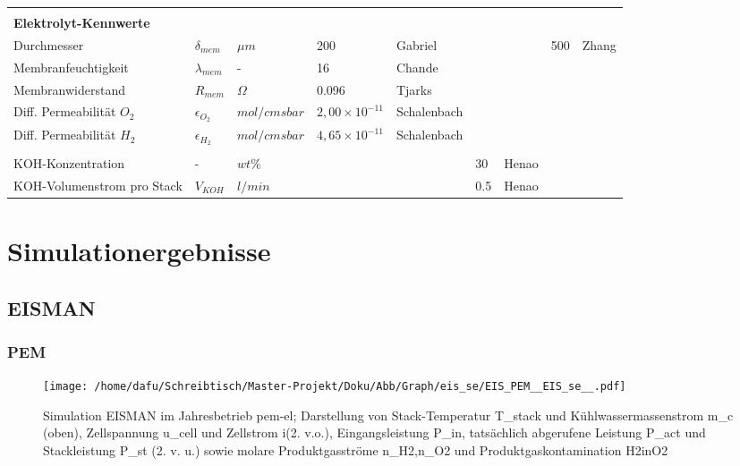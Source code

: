 \documentclass[onecolumn,10pt,titlepage]{article}
\begin{document}
\begin{table}[]
\begin{tabular*}{\textwidth}{lllllllll}
		&&&&&&&& \\
		\textbf{Elektrolyt-Kennwerte}&&&&&&&& \\
		Durchmesser								& $\delta_{mem}$		& $\mu{m}$			& 200		& Gabriel	&			&			& 500   & Zhang \\			
		Membranfeuchtigkeit						& $\lambda_{mem}$		& -					& 16  		& Chande	& 			& 			& 		& 		\\
		Membranwiderstand						& $R_{mem}$ 			& $\Omega$			& 0.096		& Tjarks	& 	 		& 			& 	 	& 		\\
		Diff. Permeabilität $O_{2}$				& $\epsilon_{O_{2}}$	& $mol/cmsbar$		& $2,00\times{10^{-11}}$	& Schalenbach			&			&						&	 \\
		Diff. Permeabilität $H_{2}$				& $\epsilon_{H_{2}}$	& $mol/cmsbar$		& $4,65\times{10^{-11}}$	& Schalenbach			&			&						&	 \\
		
		&&&&&&&& \\
		KOH-Konzentration 						& - 					& $wt\%$ 			&			&			& 30 		& Henao		&		& 		\\
		KOH-Volumenstrom pro Stack 				& $V_{KOH}$ 			& $l/min$ 			&			&			& 0.5 		& Henao		&		& 		\\
		
		
		
		
	\end{tabular*}
\end{table}
\section{Simulationergebnisse}
\subsection{EISMAN}
\subsubsection{PEM}
\begin{figure}[H]
	\centering
	\texttt{[image: /home/dafu/Schreibtisch/Master-Projekt/Doku/Abb/Graph/eis\_se/EIS\_PEM\_\_EIS\_se\_\_.pdf]}
	
	\caption[Simulation EISMAN im Jahresbetrieb \gls{pem}-\gls{el}]{Simulation EISMAN im Jahresbetrieb \gls{pem}-\gls{el}; Darstellung von Stack-Temperatur \gls{T_stack} und Kühlwassermassenstrom \gls{m_c} (oben), Zellspannung \gls{u_cell} und Zellstrom \gls{i}(2. v.o.), Eingangsleistung \gls{P_in},  tatsächlich abgerufene Leistung \gls{P_act} und Stackleistung \gls{P_st} (2. v. u.) sowie molare Produktgasströme \gls{n_H2},\gls{n_O2} und Produktgaskontamination \gls{H2inO2}}
	\label{fig:plt_se_EIS_PEM} 
\end{figure}
\end{document}
